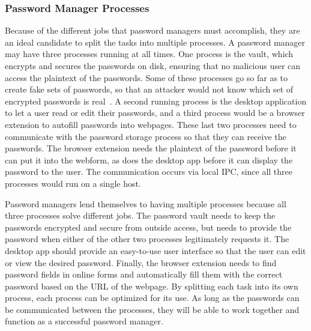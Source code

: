 \subsubsection{Password Manager Processes}
\label{sec:passwordManagerProcesses}
Because of the different jobs that password managers must accomplish, they are an ideal candidate to split the tasks into multiple processes.  A password manager may have three processes running at all times.  One process is the vault, which encrypts and secures the passwords on disk, ensuring that no malicious user can access the plaintext of the passwords.  Some of these processes go so far as to create fake sets of passwords, so that an attacker would not know which set of encrypted passwords is real~\cite{bojinov2010kamouflage}.  A second running process is the desktop application to let a user read or edit their passwords, and a third process would be a browser extension to autofill passwords into webpages.  These last two processes need to communicate with the password storage process so that they can receive the passwords.  The browser extension needs the plaintext of the password before it can put it into the webform, as does the desktop app before it can display the password to the user.  The communication occurs via local IPC, since all three processes would run on a single host.

Password managers lend themselves to having multiple processes because all three processes solve different jobs.  The password vault needs to keep the passwords encrypted and secure from outside access, but needs to provide the password when either of the other two processes legitimately requests it.  The desktop app should provide an easy-to-use user interface so that the user can edit or view the desired password.  Finally, the browser extension needs to find password fields in online forms and automatically fill them with the correct password based on the URL of the webpage.  By splitting each task into its own process, each process can be optimized for its use.  As long as the passwords can be communicated between the processes, they will be able to work together and function as a successful password manager.

